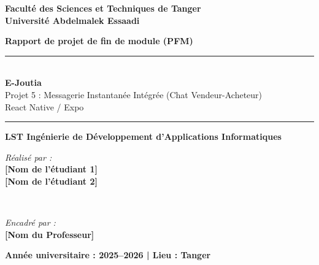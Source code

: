 \documentclass[12pt,a4paper]{report}
\begin{document}
\begin{titlepage}
    \centering
    \vspace*{1cm}
    
    {\large \textbf{Faculté des Sciences et Techniques de Tanger}} \\
    {\large \textbf{Université Abdelmalek Essaadi}} \\
    
    \vspace{2.5cm}
    
    {\Huge \textbf{Rapport de projet de fin de module (PFM)}} \\
    
    \vspace{1.5cm}
    
    \rule{\linewidth}{0.5mm} \\[0.5cm]
    {\Huge \textbf{E-Joutia}} \\
    {\Large Projet 5 : Messagerie Instantanée Intégrée (Chat Vendeur-Acheteur)} \\[0.5cm]
    {\large React Native / Expo} \\
    \rule{\linewidth}{0.5mm}
    
    \vspace{2cm}
    
    {\Large \textbf{LST Ingénierie de Développement d'Applications Informatiques}} \\
    
    \vspace{2.5cm}
    
    \begin{minipage}{0.45\textwidth}
        \begin{flushleft} \large
            \emph{Réalisé par :}\\
            \textbf{[Nom de l'étudiant 1]} \\
            \textbf{[Nom de l'étudiant 2]} \\
        \end{flushleft}
    \end{minipage}
    ~
    \begin{minipage}{0.45\textwidth}
        \begin{flushright} \large
            \emph{Encadré par :} \\
            \textbf{[Nom du Professeur]} \\
        \end{flushright}
    \end{minipage}
    
    \vfill
    
    {\large \textbf{Année universitaire : 2025--2026 \quad | \quad Lieu : Tanger}}
    
\end{titlepage}
\end{document}
